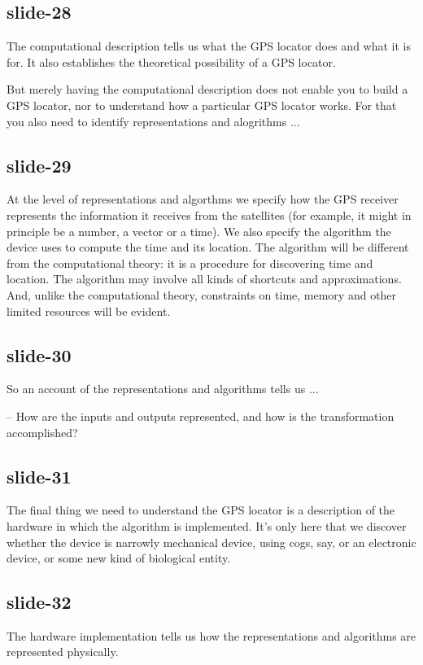 \documentclass[12pt,\papersize]{extarticle}
\begin{document}
\subsection{slide-28}
The computational description tells us what the GPS locator does and
what it is for.
It also establishes the theoretical possibility of a GPS locator.

But merely having the computational description does not enable you to build
a GPS locator, nor to understand how a particular GPS locator works.
For that you also need to identify representations and alogrithms ...

\subsection{slide-29}
At the level of representations and algorthms we specify
how the GPS receiver represents the information it receives from the satellites
(for example, it might in principle be a number, a vector or a time).
We also specify the algorithm the device uses to compute the time and its location.
The algorithm will be different from the computational theory: it is a procedure
for discovering time and location.
The algorithm may involve all kinds of shortcuts and approximations.
And, unlike the computational theory, constraints on time, memory and other
limited resources will be evident.

\subsection{slide-30}
So an account of the representations and algorithms tells us ...

-- How are the inputs and outputs represented, and how is the transformation accomplished?

\subsection{slide-31}
The final thing we need to understand the GPS locator is a description of the
hardware in which the algorithm is implemented.  It’s only here that
we discover whether the device is narrowly mechanical device, using cogs, say,
or an electronic device, or some new kind of biological entity.

\subsection{slide-32}
The hardware implementation tells us how the representations and algorithms are represented physically.
\end{document}
